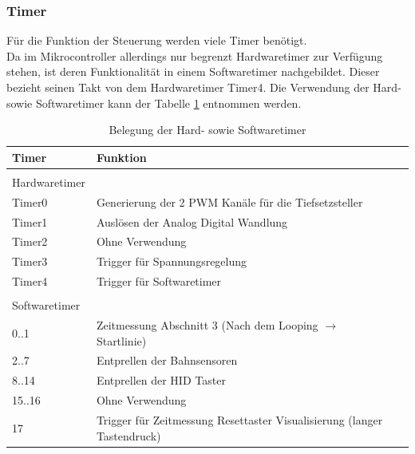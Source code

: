 \documentclass[a4paper, 11pt]{report}
\begin{document}
			\subsubsection{Timer}\label{subsubsec:Timer}
			Für die Funktion der Steuerung werden viele Timer benötigt.\\
			Da im Mikrocontroller allerdings nur begrenzt Hardwaretimer zur Verfügung stehen, ist deren Funktionalität in einem Softwaretimer nachgebildet.
			Dieser bezieht seinen Takt von dem  Hardwaretimer \glqq Timer4\grqq.
			Die Verwendung der Hard- sowie Softwaretimer kann der Tabelle \ref{tab:belegungTimer} entnommen werden.
				\begin{table}[ht]
					\caption{Belegung der Hard- sowie Softwaretimer}
					\begin{tabular}{|l|l|l|}
						\hline
						\textbf{Timer} & \textbf{Funktion}\\
						\hline
						\hline
						 & \\
						Hardwaretimer &\\
						\hline
						\hline
						Timer0 & Generierung der 2 PWM Kanäle für die Tiefsetzsteller\\
						\hline
						Timer1 & Auslösen der Analog Digital Wandlung\\
						\hline
						Timer2 & Ohne Verwendung\\
						\hline
						Timer3 & Trigger für Spannungsregelung\\
						\hline
						Timer4 & Trigger für Softwaretimer\\
						\hline
						\hline
						 & \\
						Softwaretimer &\\
						\hline
						\hline
						0..1 & Zeitmessung Abschnitt 3 (Nach dem Looping $\rightarrow$ Startlinie)\\
						\hline
						2..7 & Entprellen der Bahnsensoren\\
						\hline
						8..14 & Entprellen der HID Taster\\
						\hline
						15..16 & Ohne Verwendung\\
						\hline
						17 & Trigger für Zeitmessung Resettaster Visualisierung (langer Tastendruck)\\
						\hline
					\end{tabular}
					
					\label{tab:belegungTimer}
				\end{table}
\end{document}
